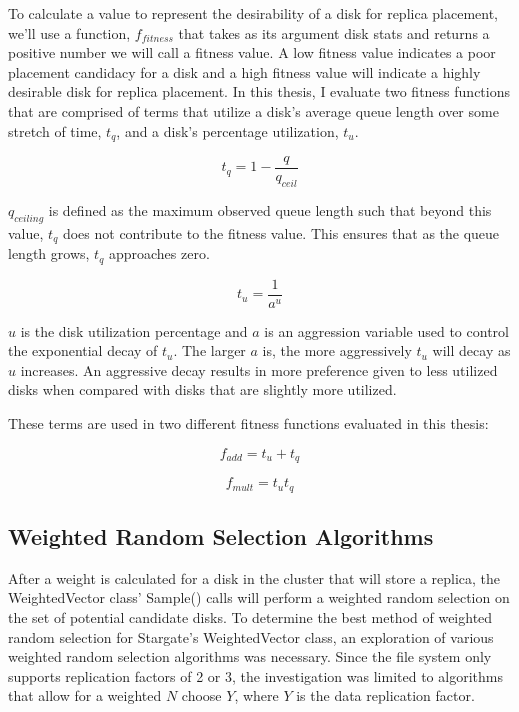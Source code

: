 \documentclass[12pt]{article}
\begin{document}
  To calculate a value to represent the desirability of a disk for replica
  placement, we'll use a function, $f_{fitness}$ that takes as its argument
  disk stats and returns a positive number we will call a fitness value. A low
  fitness value indicates a poor placement candidacy for a disk and a high
  fitness value will indicate a highly desirable disk for replica placement. In
  this thesis, I evaluate two fitness functions that are comprised of terms
  that utilize a disk's average queue length over some stretch of time,
  $t_{q}$, and a disk's percentage utilization, $t_{u}$.

  \begin{equation}
    t_{q} = 1 - \frac{q}{q_{ceil}}
  \end{equation}

  $q_{ceiling}$ is defined as the maximum observed queue length such that
  beyond this value, $t_{q}$ does not contribute to the fitness
  value. This ensures that as the queue length grows, $t_{q}$
  approaches zero. 

  \begin{equation}
    t_{u} = \frac{1}{a^{u}}
  \end{equation}

  $u$ is the disk utilization percentage and $a$ is an aggression variable used
  to control the exponential decay of $t_{u}$. The larger $a$ is, the
  more aggressively $t_{u}$ will decay as $u$ increases. An
  aggressive decay results in more preference given to less utilized disks when
  compared with disks that are slightly more utilized.

  These terms are used in two different fitness functions evaluated in this
  thesis:

  \begin{equation}
    f_{add} = t_{u} + t_{q}
  \end{equation}

  \begin{equation}
    f_{mult} = t_{u}t_{q}
  \end{equation}


  \subsection{Weighted Random Selection Algorithms}

  After a weight is calculated for a disk in the cluster that will store a
  replica, the WeightedVector class' Sample() calls will perform a weighted
  random selection on the set of potential candidate disks. To determine the
  best method of weighted random selection for Stargate's WeightedVector class,
  an exploration of various weighted random selection algorithms was necessary.
  Since the file system only supports replication factors of 2 or 3, the
  investigation was limited to algorithms that allow for a weighted $N$ choose
  $Y$, where $Y$ is the data replication factor.
\end{document}
